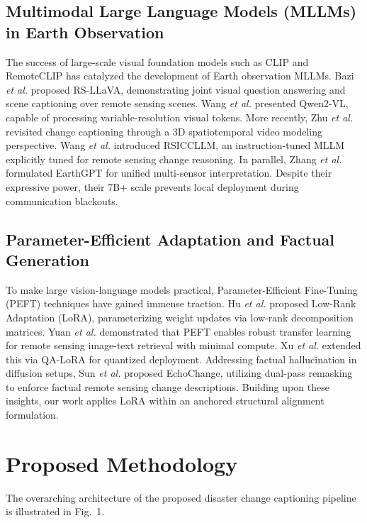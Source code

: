 \documentclass[conference]{IEEEtran}
\begin{document}
\subsection{Multimodal Large Language Models (MLLMs) in Earth Observation}
The success of large-scale visual foundation models such as CLIP \cite{radford2021learning} and RemoteCLIP \cite{kembhavi2023remoteclip} has catalyzed the development of Earth observation MLLMs. Bazi \textit{et al.} \cite{bazi2024rsllava} proposed RS-LLaVA, demonstrating joint visual question answering and scene captioning over remote sensing scenes. Wang \textit{et al.} \cite{wang2024qwen2vl} presented Qwen2-VL, capable of processing variable-resolution visual tokens. More recently, Zhu \textit{et al.} \cite{zhu2025change3d} revisited change captioning through a 3D spatiotemporal video modeling perspective. Wang \textit{et al.} \cite{wang2026rsiccllm} introduced RSICCLLM, an instruction-tuned MLLM explicitly tuned for remote sensing change reasoning. In parallel, Zhang \textit{et al.} \cite{zhang2024earthgpt} formulated EarthGPT for unified multi-sensor interpretation. Despite their expressive power, their 7B+ scale prevents local deployment during communication blackouts.

\subsection{Parameter-Efficient Adaptation and Factual Generation}
To make large vision-language models practical, Parameter-Efficient Fine-Tuning (PEFT) techniques have gained immense traction. Hu \textit{et al.} \cite{hu2022lora} proposed Low-Rank Adaptation (LoRA), parameterizing weight updates via low-rank decomposition matrices. Yuan \textit{et al.} \cite{yuan2023parameter} demonstrated that PEFT enables robust transfer learning for remote sensing image-text retrieval with minimal compute. Xu \textit{et al.} \cite{xu2023qalora} extended this via QA-LoRA for quantized deployment. Addressing factual hallucination in diffusion setups, Sun \textit{et al.} \cite{sun2026echochange} proposed EchoChange, utilizing dual-pass remasking to enforce factual remote sensing change descriptions. Building upon these insights, our work applies LoRA within an anchored structural alignment formulation.

\section{Proposed Methodology}
The overarching architecture of the proposed disaster change captioning pipeline is illustrated in Fig.~1.
\end{document}
